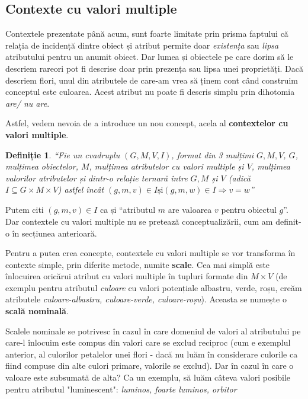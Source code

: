 \documentclass[12pt, a4paper, twoside, romanian]{teza-upb}
\newtheorem{defn}{Definiție}
\begin{document}
    \subsection{Contexte cu valori multiple}

      Contextele prezentate până acum, sunt foarte limitate prin prisma faptului că relația de incidență dintre obiect și atribut permite doar \textit{existența} sau \textit{lipsa} atributului pentru un anumit obiect.
      Dar lumea și obiectele pe care dorim să le descriem rareori pot fi descrise doar prin prezența sau lipsa unei proprietăți. Dacă descriem flori, unul din atributele de care-am vrea să ținem cont când construim conceptul este culoarea. Acest atribut nu poate fi descris simplu prin dihotomia \textit{are/ nu are}.

      Astfel, vedem nevoia de a introduce un nou concept, acela al \textbf{contextelor cu valori multiple}.

      \begin{defn}
        \cite{Carpineto:2004:CDA:975252} ``Fie un cvadruplu $(G, M, V, I)$, format din 3 mulțimi $G, M, V$, $G$, mulțimea obiectelor, $M$, mulțimea atributelor cu valori multiple și $V$, mulțimea valorilor atributelor și dintr-o relație ternară între $G, M$ și $V$ (adică $I \subseteq G \times M \times V $) astfel încât $(g, m, v) \in I \text{și} (g, m, w) \in I \Rightarrow v = w$''
      \end{defn}


      Putem citi $(g, m, v) \in I$ ca și ``atributul $m$ are valoarea $v$ pentru obiectul $g$''. Dar contextele cu valori multiple nu se pretează conceptualizării, cum am definit-o în secțiunea anterioară. 
      
      Pentru a putea crea concepte, contextele cu valori multiple se vor transforma în contexte simple, prin diferite metode, numite \textbf{scale}. Cea mai simplă este înlocuirea oricărui atribut cu valori multiple în tupluri formate din $M \times V$ (de exemplu pentru atributul \textit{culoare} cu valori potențiale {albastru, verde, roșu}, creăm atributele \textit{culoare-albastru, culoare-verde, culoare-roșu}). Aceasta se numește o \textbf{scală nominală}.

      Scalele nominale se potrivesc în cazul în care domeniul de valori al atributului pe care-l înlocuim este compus din valori care se exclud reciproc (cum e exemplul anterior, al culorilor petalelor unei flori - dacă nu luăm în considerare culorile ca fiind compuse din alte culori primare, valorile se exclud). Dar în cazul în care o valoare este subsumată de alta? Ca un exemplu, să luăm câteva valori posibile pentru atributul "luminescent": {\textit{luminos, foarte luminos, orbitor}}
\end{document}
